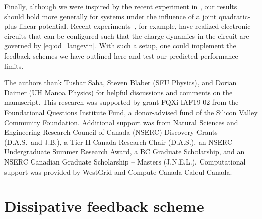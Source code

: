 \documentclass[%
reprint,
bibnotes, amsmath, amssymb, aps, pre,
 showkeys,
floatfix
]{revtex4-2}
\begin{document}
Finally, although we were inspired by the recent experiment in \cite{Saha2021}, our results should hold more generally for systems under the influence of a joint quadratic-plus-linear potential. 
Recent experiments~\cite{Chang2021}, for example, have realized electronic circuits that can be configured such that the charge dynamics in the circuit are governed by \eqref{eq:od_langevin}. 
With such a setup, one could implement the feedback schemes we have outlined here and test our predicted performance limits. 

\begin{acknowledgments}
The authors thank Tushar Saha, Steven Blaber (SFU Physics), and Dorian Daimer (UH Manoa Physics) for helpful discussions and comments on the manuscript.
This research was supported by grant FQXi-IAF19-02 from the Foundational Questions Institute Fund, a donor-advised fund of the Silicon Valley Community Foundation. 
Additional support was from Natural Sciences and Engineering Research Council of Canada (NSERC) Discovery Grants (D.A.S.\ and J.B.), a Tier-II Canada Research Chair (D.A.S.), an NSERC Undergraduate Summer Research Award, a BC Graduate Scholarship, and an NSERC Canadian Graduate Scholarship -- Masters (J.N.E.L.).
Computational support was provided by WestGrid and Compute Canada Calcul Canada.
\end{acknowledgments}



\appendix

\section{Dissipative feedback scheme}
\label{sec:diss_feedback}
\end{document}

